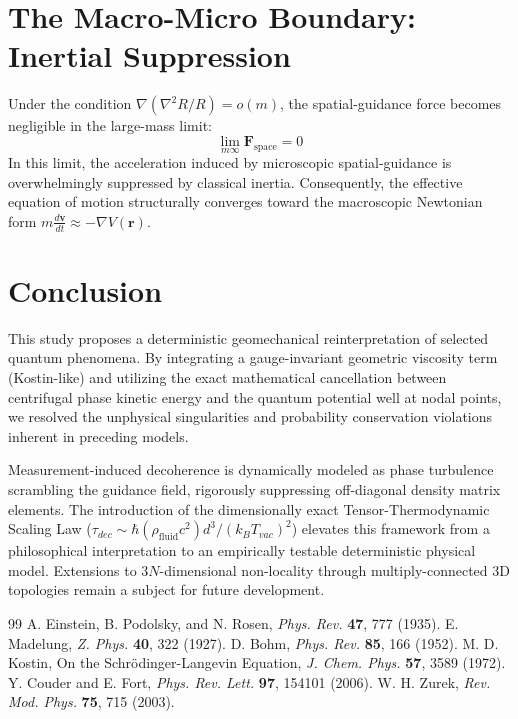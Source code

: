 \documentclass[reprint,amsmath,amssymb,aps,prd]{revtex4-2}
\begin{document}
\section{The Macro-Micro Boundary: Inertial Suppression}
Under the condition $\nabla (\nabla^2 R/R) = o(m)$, the spatial-guidance force becomes negligible in the large-mass limit:
\begin{equation}
\lim_{m \infty} \mathbf{F}_{\mathrm{space}} = 0
\end{equation}
In this limit, the acceleration induced by microscopic spatial-guidance is overwhelmingly suppressed by classical inertia. Consequently, the effective equation of motion structurally converges toward the macroscopic Newtonian form $m \frac{d\mathbf{v}}{dt} \approx -\nabla V(\mathbf{r})$.

\section{Conclusion}
This study proposes a deterministic geomechanical reinterpretation of selected quantum phenomena. By integrating a gauge-invariant geometric viscosity term (Kostin-like) and utilizing the exact mathematical cancellation between centrifugal phase kinetic energy and the quantum potential well at nodal points, we resolved the unphysical singularities and probability conservation violations inherent in preceding models. 

Measurement-induced decoherence is dynamically modeled as phase turbulence scrambling the guidance field, rigorously suppressing off-diagonal density matrix elements. The introduction of the dimensionally exact Tensor-Thermodynamic Scaling Law ($\tau_{dec} \sim \hbar (\rho_{\mathrm{fluid}} c^2) d^3 / (k_B T_{vac})^2$) elevates this framework from a philosophical interpretation to an empirically testable deterministic physical model. Extensions to $3N$-dimensional non-locality through multiply-connected 3D topologies remain a subject for future development.

\begin{thebibliography}{99}
 A. Einstein, B. Podolsky, and N. Rosen, \textit{Phys. Rev.} \textbf{47}, 777 (1935).
 E. Madelung, \textit{Z. Phys.} \textbf{40}, 322 (1927).
 D. Bohm, \textit{Phys. Rev.} \textbf{85}, 166 (1952).
 M. D. Kostin, On the Schrödinger-Langevin Equation, \textit{J. Chem. Phys.} \textbf{57}, 3589 (1972).
 Y. Couder and E. Fort, \textit{Phys. Rev. Lett.} \textbf{97}, 154101 (2006).
 W. H. Zurek, \textit{Rev. Mod. Phys.} \textbf{75}, 715 (2003).
\end{thebibliography}
\end{document}

